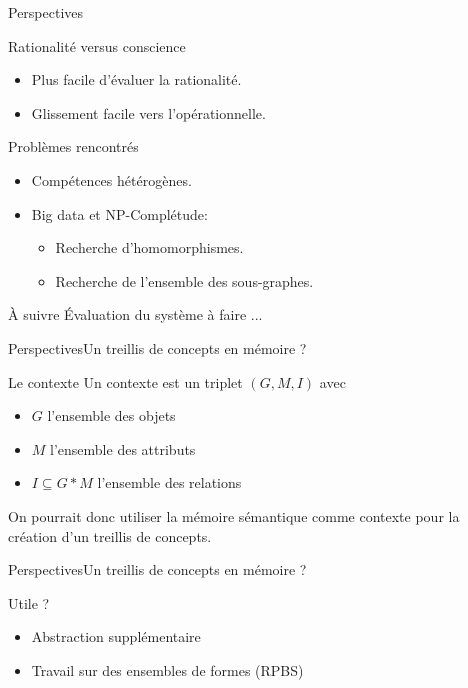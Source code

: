 \begin{frame}{Perspectives}

\begin{block}{Rationalité versus conscience}
\begin{itemize}
\item Plus facile d'évaluer la rationalité.
\item Glissement facile vers l'opérationnelle.
\end{itemize}
\end{block}

\pause

\begin{block}{Problèmes rencontrés}
\begin{itemize}
\item Compétences hétérogènes.
\item Big data et NP-Complétude:
\begin{itemize}
\item Recherche d'homomorphismes.
\item Recherche de l'ensemble des sous-graphes.
\end{itemize}
\end{itemize}
\end{block}

\pause

\begin{block}{À suivre}
Évaluation du système à faire ...
\end{block}

\end{frame}

\begin{frame}{Perspectives}{Un treillis de concepts en mémoire ?}
\begin{block}{Le contexte}
Un contexte est un triplet $(G,M,I)$ avec
\begin{itemize}
\item $G$ l'ensemble des objets
\item $M$ l'ensemble des attributs
\item $I \subseteq G*M$ l'ensemble des relations
\end{itemize}
On pourrait donc utiliser la mémoire sémantique comme contexte pour la création d'un treillis de concepts.
\end{block}
\end{frame}

\begin{frame}{Perspectives}{Un treillis de concepts en mémoire ?}
\begin{block}{Utile ?}
\begin{itemize}
\item Abstraction supplémentaire
\item Travail sur des ensembles de formes (RPBS)
\end{itemize}
\end{block}
\end{frame}

